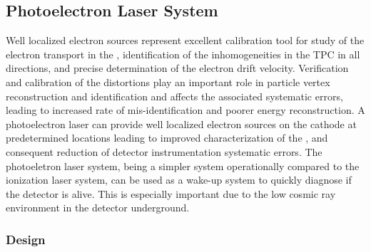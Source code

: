 \subsection{Photoelectron Laser System}
\label{sec:sp-calib-sys-las-pe}
Well localized electron sources represent excellent calibration tool for study of the electron transport in the , identification of the inhomogeneities in the TPC \efield in all directions, and precise determination of the electron drift velocity. Verification and calibration of the \efield distortions play an important role in particle vertex reconstruction and identification and affects the associated systematic errors, leading to increased rate of mis-identification and poorer energy reconstruction. A photoelectron laser can provide well localized electron sources on the cathode at predetermined locations leading to improved characterization of the \efield, and consequent reduction of detector instrumentation systematic errors. The photoeletron laser system, being a simpler system operationally compared to the ionization laser system, can be used as a wake-up system to quickly diagnose if the detector is alive. This is especially important due to the low cosmic ray environment in the detector underground. 

\subsubsection{Design}
\label{sec:sp-calib-sys-las-pe-des}

